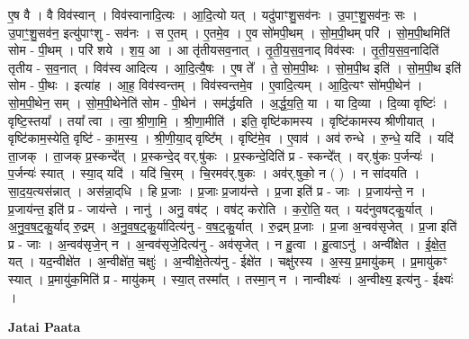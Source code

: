 \documentclass[17pt]{extarticle}
\begin{document}
ए॒ष वै । वै विव॑स्वान् । विव॑स्वानादि॒त्यः । आ॒दि॒त्यो यत् । यदु॑पाꣳशु॒सव॑नः । उ॒पाꣳ॒॒शु॒सव॑नः॒ सः । उ॒पाꣳ॒॒शु॒सव॑न॒ इत्यु॑पाꣳशु - सव॑नः । स ए॒तम् । ए॒तमे॒व । ए॒व सो॑मपी॒थम् । सो॒म॒पी॒थम् परि॑ । सो॒म॒पी॒थमिति॑ सोम - पी॒थम् । परि॑ शये । श॒य॒ आ । आ तृ॑तीयसव॒नात् । तृ॒ती॒य॒स॒व॒नाद् विव॑स्वः । तृ॒ती॒य॒स॒व॒नादिति॑ तृतीय - स॒व॒नात् । विव॑स्व आदित्य । आ॒दि॒त्यै॒षः । ए॒ष ते᳚ । ते॒ सो॒म॒पी॒थः । सो॒म॒पी॒थ इति॑ । सो॒म॒पी॒थ इति॑ सोम - पी॒थः । इत्या॑ह । आ॒ह॒ विव॑स्वन्तम् । विव॑स्वन्तमे॒व । ए॒वादि॒त्यम् । आ॒दि॒त्यꣳ सो॑मपी॒थेन॑ । सो॒म॒पी॒थेन॒ सम् । सो॒म॒पी॒थेनेति॑ सोम - पी॒थेन॑ । सम॑र्द्धयति । अ॒र्द्ध॒य॒ति॒ या । या दि॒व्या । दि॒व्या वृष्टिः॑ । वृष्टि॒स्तया᳚ । तया᳚ त्वा । त्वा॒ श्री॒णा॒मि॒ । श्री॒णा॒मीति॑ । इति॒ वृष्टि॑कामस्य । वृष्टि॑कामस्य श्रीणीयात् । वृष्टि॑काम॒स्येति॒ वृष्टि॑ - का॒म॒स्य॒ । श्री॒णी॒या॒द् वृष्टि᳚म् । वृष्टि॑मे॒व । ए॒वाव॑ । अव॑ रुन्धे । रु॒न्धे॒ यदि॑ । यदि॑ ता॒जक् । ता॒जक् प्र॒स्कन्दे᳚त् । प्र॒स्कन्दे॒द् वर्.षु॑कः । प्र॒स्कन्दे॒दिति॑ प्र - स्कन्दे᳚त् । वर्.षु॑कः प॒र्जन्यः॑ । प॒र्जन्यः॑ स्यात् । स्या॒द् यदि॑ । यदि॑ चि॒रम् । चि॒रमव॑र्.षुकः । अव॑र्.षुको॒ न ( ) । न सा॑दयति । सा॒द॒य॒त्यस॑न्नात् । अस॑न्ना॒द्‌धि । हि प्र॒जाः । प्र॒जाः प्र॒जाय॑न्ते । प्र॒जा इति॑ प्र - जाः । प्र॒जाय॑न्ते॒ न । प्र॒जाय॑न्त॒ इति॑ प्र - जाय॑न्ते । नानु॑ । अनु॒ वष॑ट् । वष॑ट् करोति । क॒रो॒ति॒ यत् । यद॑नुवषट्कु॒र्यात् । अ॒नु॒व॒ष॒ट्॒कु॒र्याद् रु॒द्रम् । अ॒नु॒व॒ष॒ट्॒कु॒र्यादित्य॑नु - व॒ष॒ट्॒कु॒र्यात् । रु॒द्रम् प्र॒जाः । प्र॒जा अ॒न्वव॑सृजेत् । प्र॒जा इति॑ प्र - जाः । अ॒न्वव॑सृजे॒न् न । अ॒न्वव॑सृजे॒दित्य॑नु - अव॑सृजेत् । न हु॒त्वा । हु॒त्वाऽनु॑ । अन्वी᳚क्षेत । ई॒क्षे॒त॒ यत् । यद॒न्वीक्षे॑त । अ॒न्वीक्षे॑त॒ चक्षुः॑ । अ॒न्वीक्षे॒तेत्य॑नु - ईक्षे॑त । चक्षु॑रस्य । अ॒स्य॒ प्र॒मायु॑कम् । प्र॒मायु॑कꣳ स्यात् । प्र॒मायु॑क॒मिति॑ प्र - मायु॑कम् । स्या॒त् तस्मा᳚त् । तस्मा॒न् न । नान्वीक्ष्यः॑ । अ॒न्वीक्ष्य॒ इत्य॑नु - ईक्ष्यः॑ । \newline

\textbf{Jatai Paata} \newline
\end{document}
